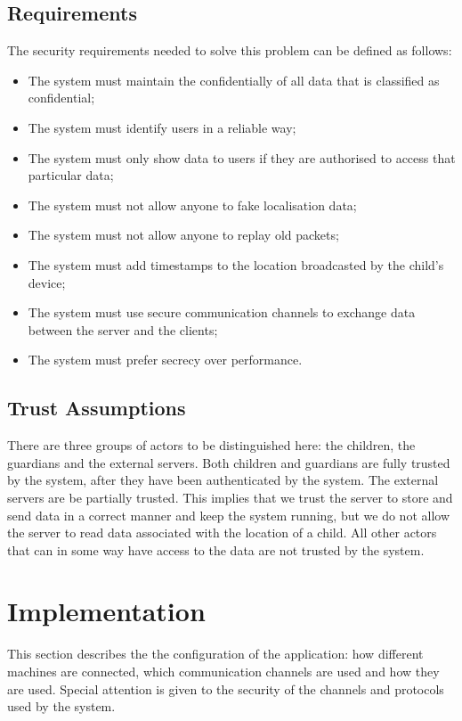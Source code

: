 \documentclass[a4paper]{article}
\begin{document}
\subsection{Requirements}

The security requirements needed to solve this problem can be defined as follows:
\begin{itemize}
    \item The system must maintain the confidentially of all data that is classified as confidential;
    \item The system must identify users in a reliable way;
    \item The system must only show data to users if they are authorised to access that particular data;
    \item The system must not allow anyone to fake localisation data;
    \item The system must not allow anyone to replay old packets;
    \item The system must add timestamps to the location broadcasted by the child's device;
    \item The system must use secure communication channels to exchange data between the server and the clients;
    \item The system must prefer secrecy over performance.
\end{itemize}

\subsection{Trust Assumptions}
There are three groups of actors to be distinguished here: the children, the guardians and the external servers. Both children and guardians are fully trusted by the system, after they have been authenticated by the system. The external servers are be partially trusted. This implies that we trust the server to store and send data in a correct manner and keep the system running, but we do not allow the server to read data associated with the location of a child. All other actors that can in some way have access to the data are not trusted by the system.

\section{Implementation}
This section describes the the configuration of the application: how different machines are connected, which communication channels are used and how they are used. Special attention is given to the security of the channels and protocols used by the system. 
\end{document}
